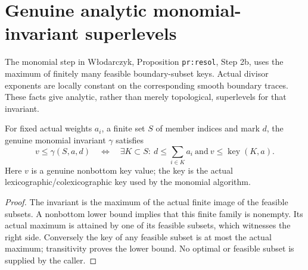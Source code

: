 \section{Genuine analytic monomial-invariant superlevels}

The monomial step in W{\l}odarczyk\cite{wlodarczyk05-hironaka},
Proposition \texttt{pr:resol}, Step 2b, uses the maximum of finitely many
feasible boundary-subset keys. Actual divisor exponents are locally
constant on the corresponding smooth boundary traces. These facts give
analytic, rather than merely topological, superlevels for that invariant.

\begin{lemma}
\label{hir:monomial-max-threshold-dictionary}
\leanok
For fixed actual weights $a_i$, a finite set $S$ of member indices and
mark $d$, the genuine monomial invariant $\gamma$ satisfies
\[
 v\le\gamma(S,a,d)\quad\Longleftrightarrow\quad
 \exists K\subset S:\ d\le\sum_{i\in K}a_i\ \text{and}\ v\le\operatorname{key}(K,a).
\]
Here $v$ is a genuine nonbottom key value; the key is the actual
lexicographic/colexicographic key used by the monomial algorithm.
\end{lemma}
\begin{proof}
The invariant is the maximum of the actual finite image of the feasible
subsets. A nonbottom lower bound implies that this finite family is
nonempty. Its actual maximum is attained by one of its feasible subsets,
which witnesses the right side. Conversely the key of any feasible subset
is at most the actual maximum; transitivity proves the lower bound.
No optimal or feasible subset is supplied by the caller.
\end{proof}


